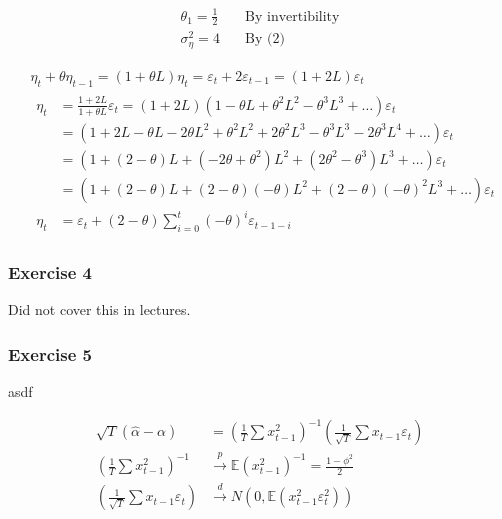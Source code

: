 {{\begin{enumerate}[label=(\alph*)]
{$$
\begin{aligned}
    \theta_{1}= \frac{1}{2} & \quad \text{By invertibility} \\
    \sigma_{\eta}^{2}=4 & \quad \text{By (2)}
\end{aligned}
$$
}
{\item 
$$
\begin{aligned}
& \eta_{t}+\theta \eta_{t-1}=(1+\theta L) \eta_{t}=\varepsilon_{t}+2 \varepsilon_{t-1}=(1+2 L) \varepsilon_{t} \\
& \begin{aligned}
\eta_{t} & =\frac{1+2 L}{1+\theta L} \varepsilon_{t}=(1+2 L)\left(1-\theta L+\theta^{2} L^{2}-\theta^{3} L^{3}+\ldots\right) \varepsilon_{t} \\
& =\left(1+2 L-\theta L-2 \theta L^{2}+\theta^{2} L^{2}+2 \theta^{2} L^{3}-\theta^{3} L^{3}-2 \theta^{3} L^{4}+\ldots\right) \varepsilon_{t} \\
& =\left(1+(2-\theta) L+\left(-2 \theta+\theta^{2}\right) L^{2}+\left(2 \theta^{2}-\theta^{3}\right) L^{3}+\ldots\right) \varepsilon_{t} \\
& =\left(1+(2-\theta) L+(2-\theta)(-\theta) L^{2}+(2-\theta)(-\theta)^{2} L^{3}+\ldots\right) \varepsilon_{t} \\
\eta_{t} & =\varepsilon_{t}+(2-\theta) \sum_{i=0}^{t}(-\theta)^{i} \varepsilon_{t-1-i}
\end{aligned}
\end{aligned}
$$

}
\end{enumerate}
}
{
\subsubsection*{Exercise 4}

\color{red} Did not cover this in lectures. \color{black}
}
{
\subsubsection*{Exercise 5}

\begin{enumerate}[label=(\alph*)]
{\item \color{white} asdf \color{black} %
\begin{enumerate}[label=(\roman*)]
{\item 
$$
\begin{aligned}
\sqrt{T}(\hat{\alpha}-\alpha) &= \left(\frac{1}{T} \sum x_{t-1}^{2}\right)^{-1}\left(\frac{1}{\sqrt{T}} \sum x_{t-1} \varepsilon_{t}\right) \\
\left(\frac{1}{T} \sum x_{t-1}^{2}\right)^{-1} &\xrightarrow{p} \mathbb{E}\left(x_{t-1}^{2}\right)^{-1}=\frac{1-\phi^{2}}{2} \\
\left(\frac{1}{\sqrt{T}} \sum x_{t-1} \varepsilon_{t}\right) &\xrightarrow{d} N\left(0, \mathbb{E}\left(x_{t-1}^{2} \varepsilon_{t}^{2}\right)\right)
\end{aligned}
$$

}
\end{enumerate}}
\end{enumerate}}}

